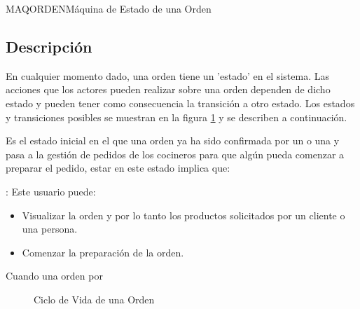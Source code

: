\begin{Maquina}{MAQORDEN}{Máquina de Estado de una Orden}
	\subsection{Descripción}
	En cualquier momento dado, una orden tiene un 'estado' en el sistema. Las acciones que los actores pueden realizar sobre una orden dependen de dicho estado y pueden tener como consecuencia la transición a otro estado. Los estados y transiciones posibles se muestran en la figura 	\ref{fig:maqorden} y se describen a continuación.
		\begin{description}
			\item[Confirmado] Es el estado inicial en el que una orden ya ha sido confirmada por un  o una  y pasa a la gestión de pedidos de los cocineros para que algún  pueda comenzar a preparar el pedido, estar en este estado implica que:

		\item {}: Este usuario puede:
		\begin{itemize}
			\item Visualizar la orden y por lo tanto los productos solicitados por un cliente o una persona. 
			\item Comenzar la preparación de la orden. 
		\end{itemize}
		
			\item[Cancelado] Cuando una orden por 
		\end{description}
	\begin{figure}[hbtp!]
	\begin{center}
		\caption{Ciclo de Vida de una Orden}
		\label{fig:maqorden}
		\end{center}
	\end{figure}

\end{Maquina}


